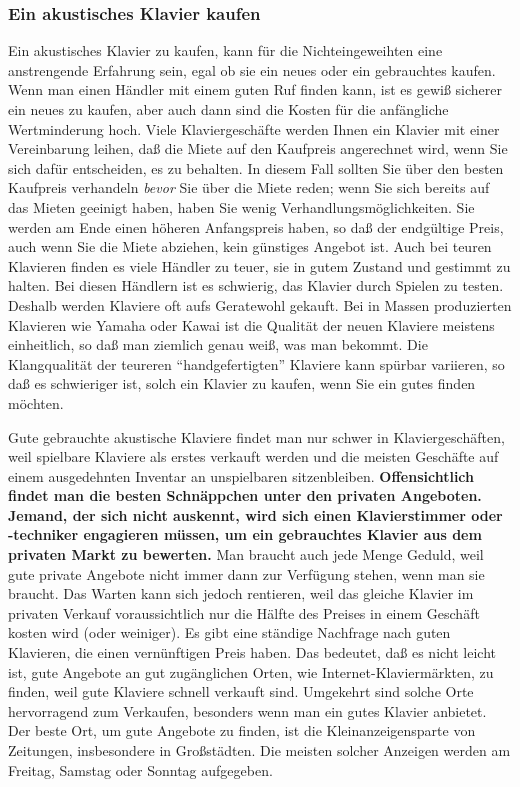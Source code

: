 
\subsubsection{Ein akustisches Klavier kaufen}
\label{c1iii17e}

Ein akustisches Klavier zu kaufen, kann für die Nichteingeweihten eine anstrengende Erfahrung sein, egal ob sie ein neues oder ein gebrauchtes kaufen.
Wenn man einen Händler mit einem guten Ruf finden kann, ist es gewiß sicherer ein neues zu kaufen, aber auch dann sind die Kosten für die anfängliche Wertminderung hoch.
Viele Klaviergeschäfte werden Ihnen ein Klavier mit einer Vereinbarung leihen, daß die Miete auf den Kaufpreis angerechnet wird, wenn Sie sich dafür entscheiden, es zu behalten.
In diesem Fall sollten Sie über den besten Kaufpreis verhandeln \textit{bevor} Sie über die Miete reden; wenn Sie sich bereits auf das Mieten geeinigt haben, haben Sie wenig Verhandlungsmöglichkeiten.
Sie werden am Ende einen höheren Anfangspreis haben, so daß der endgültige Preis, auch wenn Sie die Miete abziehen, kein günstiges Angebot ist.
Auch bei teuren Klavieren finden es viele Händler zu teuer, sie in gutem Zustand und gestimmt zu halten.
Bei diesen Händlern ist es schwierig, das Klavier durch Spielen zu testen.
Deshalb werden Klaviere oft aufs Geratewohl gekauft.
Bei in Massen produzierten Klavieren wie Yamaha oder Kawai ist die Qualität der neuen Klaviere meistens einheitlich, so daß man ziemlich genau weiß, was man bekommt.
Die Klangqualität der teureren \enquote{handgefertigten} Klaviere kann spürbar variieren, so daß es schwieriger ist, solch ein Klavier zu kaufen, wenn Sie ein gutes finden möchten.

Gute gebrauchte akustische Klaviere findet man nur schwer in Klaviergeschäften, weil spielbare Klaviere als erstes verkauft werden und die meisten Geschäfte auf einem ausgedehnten Inventar an unspielbaren sitzenbleiben.
\textbf{Offensichtlich findet man die besten Schnäppchen unter den privaten Angeboten.
Jemand, der sich nicht auskennt, wird sich einen Klavierstimmer oder -techniker engagieren müssen, um ein gebrauchtes Klavier aus dem privaten Markt zu bewerten.}
Man braucht auch jede Menge Geduld, weil gute private Angebote nicht immer dann zur Verfügung stehen, wenn man sie braucht.
Das Warten kann sich jedoch rentieren, weil das gleiche Klavier im privaten Verkauf voraussichtlich nur die Hälfte des Preises in einem Geschäft kosten wird (oder weiniger).
Es gibt eine ständige Nachfrage nach guten Klavieren, die einen vernünftigen Preis haben.
Das bedeutet, daß es nicht leicht ist, gute Angebote an gut zugänglichen Orten, wie Internet-Klaviermärkten, zu finden, weil gute Klaviere schnell verkauft sind.
Umgekehrt sind solche Orte hervorragend zum Verkaufen, besonders wenn man ein gutes Klavier anbietet.
Der beste Ort, um gute Angebote zu finden, ist die Kleinanzeigensparte von Zeitungen, insbesondere in Großstädten.
Die meisten solcher Anzeigen werden am Freitag, Samstag oder Sonntag aufgegeben.

